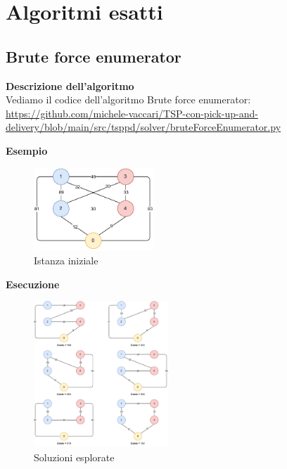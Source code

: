\documentclass[9pt]{beamer}
\begin{document}

\section{Algoritmi esatti}

\subsection{Brute force enumerator}
\begin{frame}[allowframebreaks]{\subsecname}

	\textbf{Descrizione dell’algoritmo} \\
	Vediamo il codice dell’algoritmo Brute force enumerator:
	\href{https://github.com/michele-vaccari/TSP-con-pick-up-and-delivery/blob/main/src/tsppd/solver/bruteForceEnumerator.py}{https://github.com/michele-vaccari/TSP-con-pick-up-and-delivery/blob/main/src/tsppd/solver/bruteForceEnumerator.py}

	\textbf{Esempio}
	\begin{figure}[h]
	\centering
	\includegraphics[width=0.4\textwidth]
	{../images/graph-tsppd-with-two-customers}	
	\caption{Istanza iniziale}
	\end{figure}

\framebreak

	\textbf{Esecuzione}
      	\begin{figure}[h]
	\centering
	\includegraphics[width=0.45\textwidth]
	{../images/graph-all-solutions-with-cost-tsppd-with-two-customers}	
	\caption{Soluzioni esplorate}
	\end{figure}


\end{frame}
\end{document}
